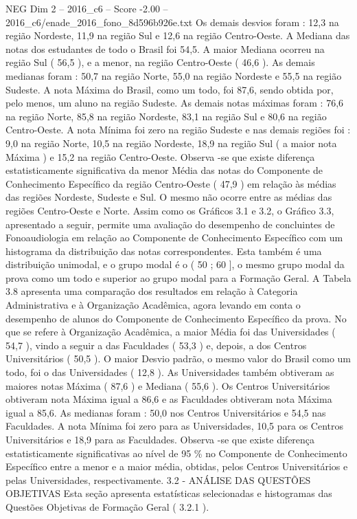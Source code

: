 \begin{textsample}{NEG Dim 2 – 2016\_c6 – Score -2.00 – 2016\_c6/enade\_2016\_fono\_8d596b926e.txt}
Os demais desvios foram : 12,3 na região Nordeste, 11,9 na região Sul e 12,6 na região Centro-Oeste.
A Mediana das notas dos estudantes de todo o Brasil foi 54,5.
A maior Mediana ocorreu na região Sul ( 56,5 ), e a menor, na região Centro-Oeste ( 46,6 ).
As demais medianas foram : 50,7 na região Norte, 55,0 na região Nordeste e 55,5 na região Sudeste.
A nota Máxima do Brasil, como um todo, foi 87,6, sendo obtida por, pelo menos, um aluno na região Sudeste.
As demais notas máximas foram : 76,6 na região Norte, 85,8 na região Nordeste, 83,1 na região Sul e 80,6 na região Centro-Oeste.
A nota Mínima foi zero na região Sudeste e nas demais regiões foi : 9,0 na região Norte, 10,5 na região Nordeste, 18,9 na região Sul ( a maior nota Máxima ) e 15,2 na região Centro-Oeste.
Observa -se que existe diferença estatisticamente significativa da menor Média das notas do Componente de Conhecimento Específico da região Centro-Oeste ( 47,9 ) em relação às médias das regiões Nordeste, Sudeste e Sul.
O mesmo não ocorre entre as médias das regiões Centro-Oeste e Norte.
Assim como os Gráficos 3.1 e 3.2, o Gráfico 3.3, apresentado a seguir, permite uma avaliação do desempenho de concluintes de Fonoaudiologia em relação ao Componente de Conhecimento Específico com um histograma da distribuição das notas correspondentes.
Esta também é uma distribuição unimodal, e o grupo modal é o ( 50 ; 60 ], o mesmo grupo modal da prova como um todo e superior ao grupo modal para a Formação Geral.
A Tabela 3.8 apresenta uma comparação dos resultados em relação à Categoria Administrativa e à Organização Acadêmica, agora levando em conta o desempenho de alunos do Componente de Conhecimento Específico da prova.
No que se refere à Organização Acadêmica, a maior Média foi das Universidades ( 54,7 ), vindo a seguir a das Faculdades ( 53,3 ) e, depois, a dos Centros Universitários ( 50,5 ).
O maior Desvio padrão, o mesmo valor do Brasil como um todo, foi o das Universidades ( 12,8 ).
As Universidades também obtiveram as maiores notas Máxima ( 87,6 ) e Mediana ( 55,6 ).
Os Centros Universitários obtiveram nota Máxima igual a 86,6 e as Faculdades obtiveram nota Máxima igual a 85,6.
As medianas foram : 50,0 nos Centros Universitários e 54,5 nas Faculdades.
A nota Mínima foi zero para as Universidades, 10,5 para os Centros Universitários e 18,9 para as Faculdades.
Observa -se que existe diferença estatisticamente significativas ao nível de 95 \% no Componente de Conhecimento Específico entre a menor e a maior média, obtidas, pelos Centros Universitários e pelas Universidades, respectivamente. 3.2 - ANÁLISE DAS QUESTÕES OBJETIVAS Esta seção apresenta estatísticas selecionadas e histogramas das Questões Objetivas de Formação Geral ( 3.2.1 ).

\end{textsample}
